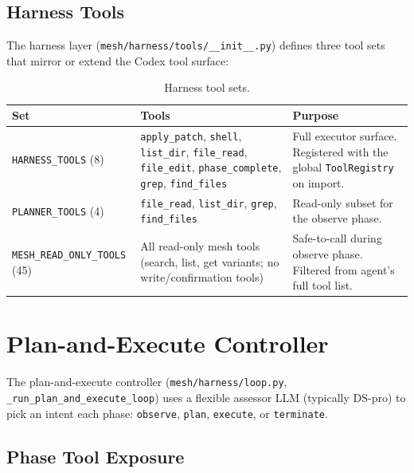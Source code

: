 \documentclass[11pt,a4paper]{article}
\newcommand{\code}[1]{\texttt{#1}}
\begin{document}
\subsection{Harness Tools}
\label{sec:harness-tools}

The harness layer (\code{mesh/harness/tools/\_\_init\_\_.py}) defines
three tool sets that mirror or extend the Codex tool surface:

\begin{table}[h]
\centering
\small
\begin{tabular}{@{}lL{4cm}L{5.5cm}@{}}
\toprule
\textbf{Set} & \textbf{Tools} & \textbf{Purpose} \\
\midrule
\code{HARNESS\_TOOLS} (8)
  & \code{apply\_patch}, \code{shell}, \code{list\_dir},
    \code{file\_read}, \code{file\_edit},
    \code{phase\_complete}, \code{grep}, \code{find\_files}
  & Full executor surface. Registered with the global
    \code{ToolRegistry} on import. \\
\addlinespace
\code{PLANNER\_TOOLS} (4)
  & \code{file\_read}, \code{list\_dir}, \code{grep},
    \code{find\_files}
  & Read-only subset for the observe phase. \\
\addlinespace
\code{MESH\_READ\_ONLY\_TOOLS} (45)
  & All read-only mesh tools (search, list, get variants;
    no write/confirmation tools)
  & Safe-to-call during observe phase. Filtered from
    agent's full tool list. \\
\bottomrule
\end{tabular}
\caption{Harness tool sets.}
\label{tab:harness-tools}
\end{table}

\section{Plan-and-Execute Controller}
\label{sec:pae}

The plan-and-execute controller (\code{mesh/harness/loop.py},
\code{\_run\_plan\_and\_execute\_loop}) uses a flexible assessor LLM
(typically DS-pro) to pick an intent each phase:
\code{observe}, \code{plan}, \code{execute}, or \code{terminate}.

\subsection{Phase Tool Exposure}
\end{document}
